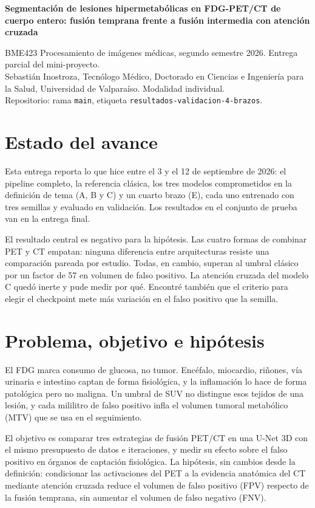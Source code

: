 \documentclass[11pt,a4paper]{article}
\begin{document}
{\sffamily\bfseries\Large Segmentación de lesiones hipermetabólicas en FDG-PET/CT de cuerpo entero: fusión temprana frente a fusión intermedia con atención cruzada\par}
\vspace{0.4em}
{\small BME423 Procesamiento de imágenes médicas, segundo semestre 2026. Entrega parcial del mini-proyecto.\\
Sebastián Inostroza, Tecnólogo Médico, Doctorado en Ciencias e Ingeniería para la Salud, Universidad de Valparaíso. Modalidad individual.\\
Repositorio: rama \texttt{main}, etiqueta \texttt{resultados-validacion-4-brazos}.\par}
\vspace{0.6em}

\section{Estado del avance}

Esta entrega reporta lo que hice entre el 3 y el 12 de septiembre de 2026: el pipeline completo, la referencia clásica, los tres modelos comprometidos en la definición de tema (A, B y C) y un cuarto brazo (E), cada uno entrenado con tres semillas y evaluado en validación. Los resultados en el conjunto de prueba van en la entrega final.

El resultado central es negativo para la hipótesis. Las cuatro formas de combinar PET y CT empatan: ninguna diferencia entre arquitecturas resiste una comparación pareada por estudio. Todas, en cambio, superan al umbral clásico por un factor de 57 en volumen de falso positivo. La atención cruzada del modelo C quedó inerte y pude medir por qué. Encontré también que el criterio para elegir el checkpoint mete más variación en el falso positivo que la semilla.

\section{Problema, objetivo e hipótesis}

El FDG marca consumo de glucosa, no tumor. Encéfalo, miocardio, riñones, vía urinaria e intestino captan de forma fisiológica, y la inflamación lo hace de forma patológica pero no maligna. Un umbral de SUV no distingue esos tejidos de una lesión, y cada mililitro de falso positivo infla el volumen tumoral metabólico (MTV) que se usa en el seguimiento.

El objetivo es comparar tres estrategias de fusión PET/CT en una U-Net 3D con el mismo presupuesto de datos e iteraciones, y medir su efecto sobre el falso positivo en órganos de captación fisiológica. La hipótesis, sin cambios desde la definición: condicionar las activaciones del PET a la evidencia anatómica del CT mediante atención cruzada reduce el volumen de falso positivo (FPV) respecto de la fusión temprana, sin aumentar el volumen de falso negativo (FNV).
\end{document}
